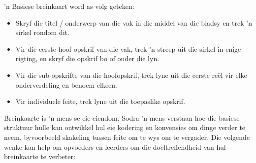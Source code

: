 'n Basiese breinkaart word as volg geteken:
\begin{itemize}[noitemsep]
\item
  Skryf die titel / onderwerp van die vak in die middel van die bladsy
  en trek 'n sirkel rondom dit.
\item
  Vir die eerste hoof opskrif van die vak, trek 'n streep uit die
  sirkel in enige rigting, en skryf die opskrif bo of onder die lyn.
\item
  Vir die sub-opskrifte van die hoofopskrif, trek lyne uit die eerste
  reël vir elke onderverdeling en benoem elkeen.
\item
  Vir individuele feite, trek lyne uit die toepaslike opskrif.
\end{itemize}
Breinkaarte is 'n mens se eie eiendom. Sodra 'n mens verstaan ​​hoe die
basiese struktuur hulle kan ontwikkel hul eie kodering en konvensies
om dinge verder te neem, byvoorbeeld skakeling tussen feite om te wys
om te vergader. Die volgende wenke kan help om opvoeders en leerders
om die doeltreffendheid van hul breinkaarte te verbeter:

